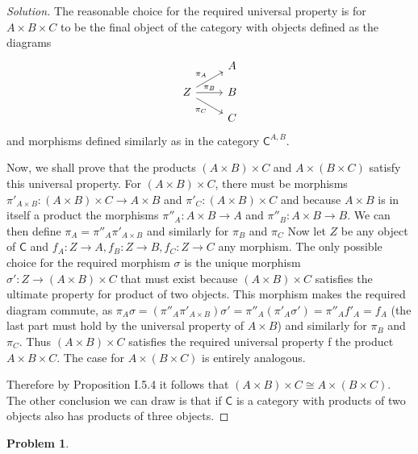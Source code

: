 \documentclass{article}
\theoremstyle{definition}
\newtheorem{problem-internal}{Problem}[subsection]
\newenvironment{problem}{
	\medskip
	\begin{problem-internal}
	}{
\end{problem-internal}
}
\newenvironment{solution}{
	\begin{proof}[Solution]
		\vspace{-8px}
		\setlength{\parskip}{4px}
		\setlength{\parindent}{0px}
	}{
\end{proof}
}
\newcommand{\C}{\mathsf{C}}
\begin{document}
\begin{solution}
	The reasonable choice for the required universal property is for $A \times B \times C$ to be the final object of the category with objects defined as the diagrams
	\begin{equation*}
		\begin{tikzcd}[row sep=small]
			& A \\
			Z \arrow[ur, "\pi_A"]
			  \arrow[r, "\pi_B"]
			  \arrow[dr, "\pi_C" swap] & B \\
			& C
		\end{tikzcd}
	\end{equation*}
	and morphisms defined similarly as in the category $\C^{A,B}$.
	
	Now, we shall prove that the products $(A \times B) \times C$ and $A \times (B \times C)$ satisfy this universal property. For $(A \times B) \times C$, there must be morphisms $\pi'_{A \times B}: (A \times B) \times C \to A \times B$ and $\pi'_C: (A \times B) \times C$ and because $A \times B$ is in itself a product the morphisms $\pi''_A: A \times B \to A$ and $\pi''_B: A \times B \to B$. We can then define $\pi_A = \pi''_A \pi'_{A \times B}$ and similarly for $\pi_B$ and $\pi_C$ Now let $Z$ be any object of $\C$ and $f_A: Z \to A, f_B: Z \to B, f_C: Z \to C$ any morphism. The only possible choice for the required morphism $\sigma$ is the unique morphism $\sigma': Z \to (A \times B) \times C$ that must exist because $(A \times B) \times C$ satisfies the ultimate property for product of two objects. This morphism makes the required diagram commute, as $\pi_A\sigma=(\pi''_A \pi'_{A \times B}) \sigma' = \pi''_A (\pi'_A \sigma') = \pi''_A f'_A = f_A$ (the last part must hold by the universal property of $A \times B$) and similarly for $\pi_B$ and $\pi_C$. Thus $(A \times B) \times C$ satisfies the required universal property f the product $A \times B \times C$. The case for $A \times (B \times C)$ is entirely analogous.
	
	Therefore by Proposition I.5.4 it follows that $(A \times B) \times C \cong A \times (B \times C)$. The other conclusion we can draw is that if $\C$ is a category with products of two objects also has products of three objects.
\end{solution}

\begin{problem}
\end{problem}
\end{document}
